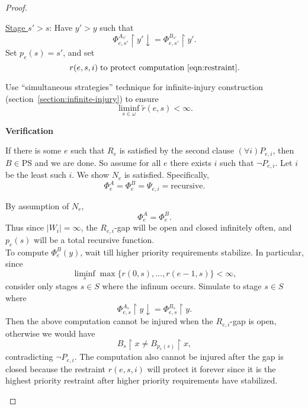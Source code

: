 \begin{proof}
\begin{tcolorbox}
      \underline{Stage $s'>s$}: Have $y'>y$ such that
      \begin{equation}
        \Phi_{e,s'}^{A_{s'}}\restriction y' \downarrow=
        \Phi_{e,s'}^{B_{s'}}\restriction y'.
      \end{equation}
       Set $p_e(s)=s'$, and set
      \begin{equation}
        r(e,s,i)\; \text{to protect computation~\eqref{eqn:restraint}}.
        \label{eqn:r}
      \end{equation}
    \end{tcolorbox}

    Use ``simultaneous strategies'' technique for infinite-injury
    construction (section~\ref{section:infinite-injury}) to ensure
    \[\liminf_{s\in\omega} \tilde{r}(e,s) <\infty.\]

    \textbf{Verification}
    \begin{tcolorbox}
      If there is some $e$ such that $R_e$ is satisfied by the second
      clause $(\forall i)P_{e,i}$, then $B\in\text{PS}$ and we are done.
       So
      assume for all $e$ there exists $i$ such that $\neg P_{e,i}$. Let $i$
      be the least such $i$. We show $N_e$ is satisfied. Specifically,
      \[\Phi^A_e=\Phi^B_e=\Psi_{e,i} =\text{recursive}.\]

      By assumption of $N_e$,
      \[\Phi^A_e=\Phi^B_e.\]
      Thus since $|W_i|=\infty$, the $R_{e,i}$-gap will be open and closed
      infinitely often, and $p_e(s)$ will be a total recursive function.\\

      To compute $\Phi^B_e(y)$, wait till higher priority requirements
      stabilize. In particular, since
      \[\liminf_s \max\{r(0,s),\ldots,r(e-1,s)\} <\infty,\]
      consider only stages $s\in S$ where the infinum occurs. Simulate to
      stage $s\in S$ where
      \begin{equation}
        \Phi_{e,s}^{A_s}\restriction y \downarrow=
        \Phi_{e,s}^{B_s}\restriction y.
      \end{equation}
      Then the above computation cannot be injured when the $R_{e,i}$-gap
      is open, otherwise we would have
      \[B_s\restriction x \neq B_{p_e(s)}\restriction x,\]
      contradicting $\neg P_{e,i}$. The computation also cannot be injured
      after the gap is closed because the restraint $r(e,s,i)$ will protect
      it forever since it is the highest priority restraint after higher
      priority requirements have stabilized.
    \end{tcolorbox}
  \end{proof}
